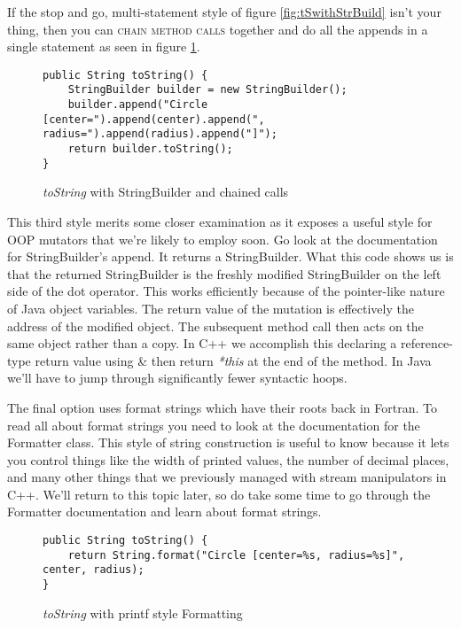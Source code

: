 \documentclass[nobib]{tufte-handout}
\begin{document}
If the stop and go, multi-statement style of figure \ref{fig:tSwithStrBuild} isn't your thing, then you can \textsc{chain method calls} together and do all the appends in a single statement as seen in figure \ref{fig:tSwithStrBuild2}.
\begin{figure}[!ht]
\begin{lstlisting}
public String toString() {
	StringBuilder builder = new StringBuilder();
	builder.append("Circle [center=").append(center).append(", radius=").append(radius).append("]");
	return builder.toString();
}
\end{lstlisting}
\label{fig:tSwithStrBuild2}
\caption{\textit{toString} with StringBuilder and chained calls}
\end{figure}
This third style merits some closer examination as it exposes a useful style for OOP mutators that we're likely to employ soon. Go look at the documentation for StringBuilder's append. It returns a StringBuilder. What this code shows us is that the returned StringBuilder is the freshly modified StringBuilder on the left side of the dot operator. This works efficiently because of the pointer-like nature of Java object variables. The return value of the mutation is effectively the address of the modified object. The subsequent method call then acts on the same object rather than a copy. In C++ we accomplish this declaring a reference-type return value using \& then return \textit{*this} at the end of the method. In Java we'll have to jump through significantly fewer syntactic hoops.

The final option uses format strings which have their roots back in Fortran. To read all about format strings you need to look at the documentation for the Formatter class. This style of string construction is useful to know because it lets you control things like the width of printed values, the number of decimal places, and many other things that we previously managed with stream manipulators in C++. We'll return to this topic later, so do take some time to go through the Formatter documentation and learn about format strings.
\begin{figure}[!ht]
\begin{lstlisting}
public String toString() {
	return String.format("Circle [center=%s, radius=%s]", center, radius);
}
\end{lstlisting}
\label{fig:tSwithFormat}
\caption{\textit{toString} with printf style Formatting}
\end{figure}
\end{document}
